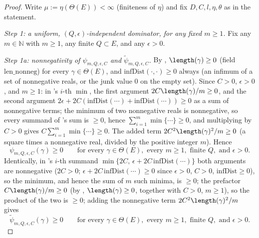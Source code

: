\begin{proof}
  Write $\mu := \eta(\Theta(E)) < \infty$ (finiteness of $\eta$) and fix $D,C,l,\eta,\theta$ as in
  the statement.

  \emph{Step 1: a uniform, $(Q,\epsilon)$-independent dominator, for any fixed $m\ge1$.} Fix any
  $m\in\mathbb{N}$ with $m\ge1$, any finite $Q\subset E$, and any $\epsilon>0$.

  \emph{Step 1a: nonnegativity of $\psi_{m,Q,\epsilon,C}$ and $\tilde\psi_{m,Q,\epsilon,C}$.} By
  , $\length(\gamma)\ge0$ (field $\mathrm{len\_nonneg}$) for every $\gamma\in\Theta(E)$,
  and $\mathrm{infDist}(\cdot,\cdot)\ge0$ always (an infimum of a set of nonnegative reals, or the
  junk value $0$ on the empty set). Since $C>0$, $\epsilon>0$, and $m\ge1$: in 's $i$-th
  $\min$, the first argument $2C\length(\gamma)/m\ge0$, and the second argument
  $2\epsilon+2C(\mathrm{infDist}(\cdots)+\mathrm{infDist}(\cdots))\ge0$ as a sum of nonnegative terms;
  the minimum of two nonnegative reals is nonnegative, so every summand of 's sum is
  $\ge0$, hence $\sum_{i=1}^m\min\{\cdots\}\ge0$, and multiplying by $C>0$ gives
  $C\sum_{i=1}^m\min\{\cdots\}\ge0$. The added term $2C^2\length(\gamma)^2/m\ge0$ (a square times a
  nonnegative real, divided by the positive integer $m$). Hence
  \begin{equation}\label{psi-nonneg}
    \psi_{m,Q,\epsilon,C}(\gamma) \ge 0 \qquad\text{for every }\gamma\in\Theta(E), \text{ every }
    m\ge1,\text{ finite }Q,\text{ and }\epsilon>0
    .
  \end{equation}
  Identically, in 's $i$-th summand $\min\{2C,\,\epsilon+2C\,\mathrm{infDist}(\cdots)\}$
  both arguments are nonnegative ($2C>0$; $\epsilon+2C\,\mathrm{infDist}(\cdots)\ge0$ since $\epsilon>0$,
  $C>0$, $\mathrm{infDist}\ge0$), so the minimum, and hence the sum of $m$ such minima, is $\ge0$; the
  prefactor $C\length(\gamma)/m\ge0$ (by , $\length(\gamma)\ge0$, together with $C>0$,
  $m\ge1$), so the product of the two is $\ge0$; adding the nonnegative term $2C^2\length(\gamma)^2/m$
  gives
  \begin{equation}\label{psitilde-nonneg}
    \tilde\psi_{m,Q,\epsilon,C}(\gamma) \ge 0 \qquad\text{for every }\gamma\in\Theta(E), \text{ every }
    m\ge1,\text{ finite }Q,\text{ and }\epsilon>0
    .
  \end{equation}


\end{proof}

